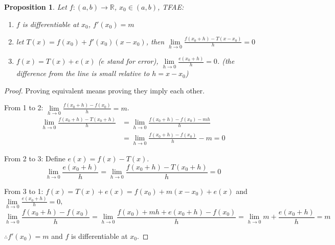 \documentclass[12pt]{article}
\theoremstyle{plain}
\newtheorem{proposition}{Proposition}[subsection]
\newcommand{\dlim}{\displaystyle\lim\limits}
\begin{document}
    
    \begin{proposition}
        Let $f:(a,b)\to\mathbb{R}$, $x_0\in(a,b)$, TFAE:
        \begin{enumerate}
					  \item $f$ is differentiable at $x_0$, $f'(x_0) = m$
            \item let $T(x) = f(x_0) +f'(x_0)(x-x_0)$, 
            then $\dlim_{h\to 0} \frac{f(x_0+h)-T(x-x_0)}h = 0$
            \item $f(x) = T(x) + e(x)$ ($e$ stand for error), 
             $\dlim_{h\to 0} \frac{e(x_0+h)} h = 0$. (the difference
             from the line is small relative to $h = x - x_0$)
        \end{enumerate}
    \end{proposition}
    \begin{proof} Proving equivalent means proving they imply each other.

        From 1 to 2: $\dlim_{h\to 0} \frac{f(x_0+h)-f(x_0)}h = m$.
				\begin{align*}
				\dlim_{h\to 0}\frac{f(x_0+h)-T(x_0+h)}h 
        &=\lim_{h\to 0} \frac{f(x_0+h) -f(x_0) -mh} h \\
        &= \dlim_{h\to 0} \frac{f(x_0+h)-f(x_0)}h - m = 0
				\end{align*}
       
        From 2 to 3: Define $e(x) = f(x) - T(x)$. 
        \[
        	\dlim_{h\to 0} \frac{e(x_0+h)}h 
					=\dlim_{h\to 0} \frac{f(x_0+h)-T(x_0+h)}h = 0
				\]

        From 3 to 1: $f(x) = T(x) + e(x) = f(x_0)+m(x-x_0)+e(x)$
         and $\dlim_{h\to 0} \frac{e(x_0+h)} h = 0$,
         \[
         	 \dlim_{h\to 0} \frac{f(x_0+h)-f(x_0)}h
						=\dlim_{h\to 0} \frac{f(x_0)+mh+e(x_0+h)-f(x_0)} h
						=\dlim_{h\to 0} m+\frac{e(x_0+h)}h = m
					\]

         $\therefore f'(x_0) = m$ and $f$ is differentiable at $x_0$.

    \end{proof}
\end{document}
